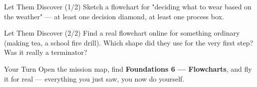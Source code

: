 \documentclass[aspectratio=169]{beamer}
\begin{document}
\begin{frame}{Let Them Discover (1/2)}
    \large
    Sketch a flowchart for "deciding what to wear based on the weather" --- at least one decision diamond, at least one process box.
\end{frame}


\begin{frame}{Let Them Discover (2/2)}
    \large
    Find a real flowchart online for something ordinary (making tea, a school fire drill). Which shape did they use for the very first step? Was it really a terminator?
\end{frame}

\begin{frame}{Your Turn}
    \Large
    Open the mission map, find \textbf{Foundations 6 — Flowcharts}, and fly it for real ---
    everything you just saw, you now do yourself.
\end{frame}
\end{document}
